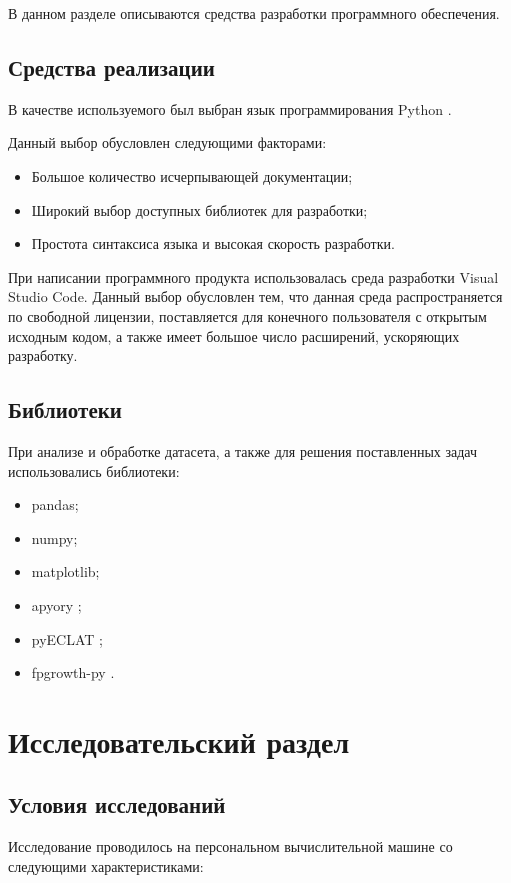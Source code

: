 \documentclass[12pt]{report}
\begin{document}
В данном разделе описываются средства разработки программного обеспечения.

\section{Средства реализации}

В качестве используемого был выбран язык программирования Python \cite{Python}.

Данный выбор обусловлен следующими факторами:
\begin{itemize}
	\item Большое количество исчерпывающей документации;
	\item Широкий выбор доступных библиотек для разработки;
	\item Простота синтаксиса языка и высокая скорость разработки.
\end{itemize} 

При написании программного продукта использовалась среда разработки Visual Studio Code. Данный выбор обусловлен тем, что данная среда распространяется по свободной лицензии, поставляется для конечного пользователя с открытым исходным кодом, а также имеет большое число расширений, ускоряющих разработку.

\section{Библиотеки}

При анализе и обработке датасета, а также для решения поставленных задач использовались библиотеки:
\begin{itemize}
	\item pandas;
	\item numpy;
	\item matplotlib;
	\item apyory \cite{apyori};
	\item pyECLAT \cite{pyECLAT};
	\item fpgrowth-py \cite{fpgrowth_py}.
\end{itemize}


\chapter{Исследовательский раздел}
\section{Условия исследований}
Исследование проводилось на персональном вычислительной машине со следующими характеристиками:
\end{document}
